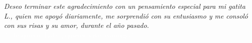 \begin{acknowledgements}
\vfill{}

%
%
\small{
    \emph{Deseo terminar este agradecimiento con un pensamiento especial para mi gatita \emph{L.}, quien me apoyó diariamente, me sorprendió con su entusiasmo y me consoló con sus risas y su amor, durante el año pasado.}\\
    \indent
    \textcolor{white}{$\heartsuit$ Te quiero, Lola, ¿quieres vivir conmigo?}
}

\end{acknowledgements}
